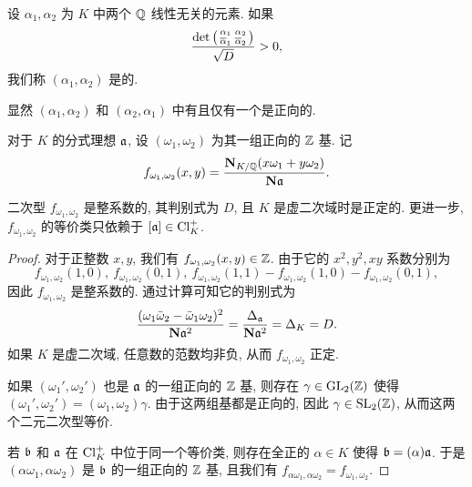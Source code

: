 \begin{definition}{}{}
设 $\alpha_1,\alpha_2$ 为 $K$ 中两个 ${\mathbb{Q}}$ 线性无关的元素. 如果
	\[\frac{\det\left(\begin{smallmatrix}
	\alpha_1&\alpha_2\\
	\overline\alpha_1&\overline\alpha_2
	\end{smallmatrix}\right)}{\sqrt{D}}>0,\]
我们称 $(\alpha_1,\alpha_2)$ 是的.
\end{definition}

显然 $(\alpha_1,\alpha_2)$ 和 $(\alpha_2,\alpha_1)$ 中有且仅有一个是正向的.

对于 $K$ 的分式理想 ${\mathfrak{a}}$, 设 $(\omega_1,\omega_2)$ 为其一组正向的 ${\mathbb{Z}}$ 基. 记
	\[f_{\omega_1,\omega_2}(x,y)=\frac{{\mathbf{N}}_{K/{\mathbb{Q}}}(x\omega_1+y\omega_2)}{{\mathbf{N}}{\mathfrak{a}}}.\]

\begin{lemma}{}{}
二次型 $f_{\omega_1,\omega_2}$ 是整系数的, 其判别式为 $D$, 且 $K$ 是虚二次域时是正定的. 更进一步, $f_{\omega_1,\omega_2}$ 的等价类只依赖于 $[{\mathfrak{a}}]\in{\mathrm{Cl}}_K^+$.
\end{lemma}
\begin{proof}
对于正整数 $x,y$, 我们有 $f_{\omega_1,\omega_2}(x,y)\in{\mathbb{Z}}$. 由于它的 $x^2,y^2,xy$ 系数分别为 
	\[f_{\omega_1,\omega_2}(1,0),\ 
	f_{\omega_1,\omega_2}(0,1),\ 
	f_{\omega_1,\omega_2}(1,1)-f_{\omega_1,\omega_2}(1,0)-f_{\omega_1,\omega_2}(0,1),\]
因此 $f_{\omega_1,\omega_2}$ 是整系数的. 通过计算可知它的判别式为
	\[\frac{(\omega_1\bar\omega_2-\bar\omega_1\omega_2)^2}{{\mathbf{N}}{\mathfrak{a}}^2}=\frac{\Delta_{\mathfrak{a}}}{{\mathbf{N}}{\mathfrak{a}}^2}=\Delta_K=D.\]
如果 $K$ 是虚二次域, 任意数的范数均非负, 从而 $f_{\omega_1,\omega_2}$ 正定.

如果 $(\omega_1',\omega_2')$ 也是 ${\mathfrak{a}}$ 的一组正向的 ${\mathbb{Z}}$ 基, 则存在 $\gamma\in{\mathrm{GL}}_2({\mathbb{Z}})$ 使得 $(\omega_1',\omega_2')=(\omega_1,\omega_2)\gamma$. 由于这两组基都是正向的, 因此 $\gamma\in{\mathrm{SL}}_2({\mathbb{Z}})$, 从而这两个二元二次型等价.

若 ${\mathfrak{b}}$ 和 ${\mathfrak{a}}$ 在 ${\mathrm{Cl}}_K^+$ 中位于同一个等价类, 则存在全正的 $\alpha\in K$ 使得 ${\mathfrak{b}}=(\alpha){\mathfrak{a}}$. 于是 $(\alpha\omega_1,\alpha\omega_2)$ 是 ${\mathfrak{b}}$ 的一组正向的 ${\mathbb{Z}}$ 基, 且我们有 $f_{\alpha\omega_1,\alpha\omega_2}=f_{\omega_1,\omega_2}$.
\end{proof}

